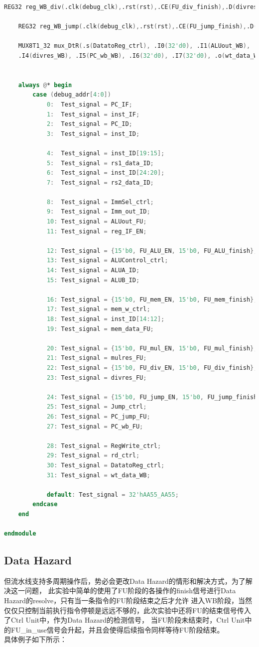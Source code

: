 \begin{lstlisting}[language = {verilog}]
	REG32 reg_WB_div(.clk(debug_clk),.rst(rst),.CE(FU_div_finish),.D(divres_FU),.Q(divres_WB));
	
	REG32 reg_WB_jump(.clk(debug_clk),.rst(rst),.CE(FU_jump_finish),.D(PC_wb_FU),.Q(PC_wb_WB));

	MUX8T1_32 mux_DtR(.s(DatatoReg_ctrl), .I0(32'd0), .I1(ALUout_WB), .I2(mem_data_WB), .I3(mulres_WB),
	.I4(divres_WB), .I5(PC_wb_WB), .I6(32'd0), .I7(32'd0), .o(wt_data_WB));  //to fill sth.in


	always @* begin
		case (debug_addr[4:0])
			0:  Test_signal = PC_IF;
			1:  Test_signal = inst_IF;
			2:  Test_signal = PC_ID;  
			3:  Test_signal = inst_ID;

			4:  Test_signal = inst_ID[19:15];
			5:  Test_signal = rs1_data_ID;
			6:  Test_signal = inst_ID[24:20];
			7:  Test_signal = rs2_data_ID;

			8:  Test_signal = ImmSel_ctrl;
			9:  Test_signal = Imm_out_ID;
			10: Test_signal = ALUout_FU;
			11: Test_signal = reg_IF_EN;

			12: Test_signal = {15'b0, FU_ALU_EN, 15'b0, FU_ALU_finish};
			13: Test_signal = ALUControl_ctrl;
			14: Test_signal = ALUA_ID;
			15: Test_signal = ALUB_ID;

			16: Test_signal = {15'b0, FU_mem_EN, 15'b0, FU_mem_finish};
			17: Test_signal = mem_w_ctrl;
			18: Test_signal = inst_ID[14:12];
			19: Test_signal = mem_data_FU;

			20: Test_signal = {15'b0, FU_mul_EN, 15'b0, FU_mul_finish};
			21: Test_signal = mulres_FU;
			22: Test_signal = {15'b0, FU_div_EN, 15'b0, FU_div_finish};
			23: Test_signal = divres_FU;

			24: Test_signal = {15'b0, FU_jump_EN, 15'b0, FU_jump_finish};
			25: Test_signal = Jump_ctrl;
			26: Test_signal = PC_jump_FU;
			27: Test_signal = PC_wb_FU;

			28: Test_signal = RegWrite_ctrl;
			29: Test_signal = rd_ctrl;
			30: Test_signal = DatatoReg_ctrl;
			31: Test_signal = wt_data_WB;
			
			default: Test_signal = 32'hAA55_AA55;
		endcase
	end

endmodule
\end{lstlisting}

\subsection{Data Hazard}
但流水线支持多周期操作后，势必会更改Data Hazard的情形和解决方式，为了解决这一问题，
此实验中简单的使用了FU阶段的各操作的finish信号进行Data Hazard的resolve，只有当一条指令的FU阶段结束之后才允许
进入WB阶段，当然仅仅只控制当前执行指令停顿是远远不够的，此次实验中还将FU的结束信号传入了Ctrl Unit中，作为Data Hazard的检测信号，
当FU阶段未结束时，Ctrl Unit中的FU\_in\_use信号会升起，并且会使得后续指令同样等待FU阶段结束。\\
具体例子如下所示：

